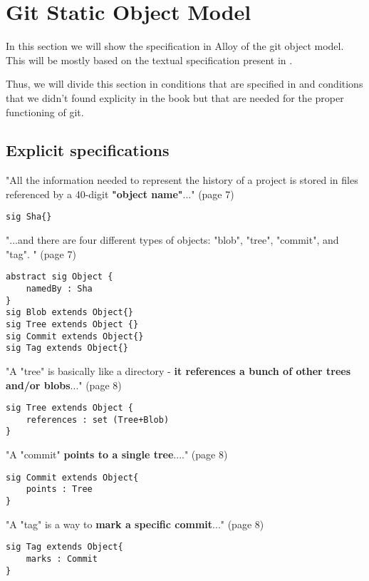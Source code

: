 \section{Git Static Object Model}

In this section we will show the specification in Alloy of the
git object model. This will be mostly based on the textual
specification present in \cite{gitComm}. \par
Thus, we will divide this section in conditions that are specified 
in \cite{gitComm} and conditions that we didn't found explicity
in the book but that are needed for the proper functioning of
git.

\subsection{Explicit specifications}

"All the information needed to represent the history
of a project is stored in files referenced by a 
40-digit {\bf "object name"}..." (page 7)

\begin{lstlisting}
sig Sha{}
\end{lstlisting}

"...and there are four different types of objects: "blob",
"tree", "commit", and "tag". " (page 7)

\begin{lstlisting}
abstract sig Object {
	namedBy : Sha
}
sig Blob extends Object{}
sig Tree extends Object {}
sig Commit extends Object{}
sig Tag extends Object{}
\end{lstlisting}

"A "tree" is basically like a directory - {\bf it references a bunch
of other trees and/or blobs}..." (page 8)

\begin{lstlisting}
sig Tree extends Object {
	references : set (Tree+Blob)
}
\end{lstlisting}

"A "commit" {\bf points to a single tree}...." (page 8)

\begin{lstlisting}
sig Commit extends Object{
	points : Tree
}
\end{lstlisting}

"A "tag" is a way to { \bf mark a specific commit}..." (page 8)

\begin{lstlisting}
sig Tag extends Object{
	marks : Commit
}
\end{lstlisting}

